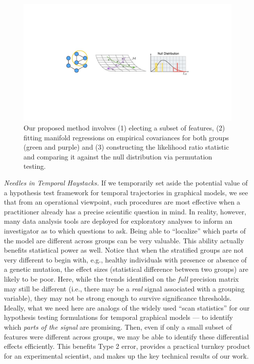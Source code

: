 \begin{figure}[h]
    \centering
    \includegraphics[width=\columnwidth,trim={6.5cm 7.5cm 6.5cm 7.5cm},clip]{chap2/method.jpg}
    \caption{\small\label{fig:model} Our proposed method involves (1) electing a subset of features, (2) fitting manifold regressions on empirical covariances for both groups (green and purple) and (3) constructing the likelihood ratio statistic and comparing it against the null distribution via permutation testing.}
\end{figure}

{\em Needles in Temporal Haystacks.} If we temporarily set aside the potential value of a hypothesis test framework for temporal 
trajectories in graphical models, we see that
from an operational viewpoint, such procedures are most effective when a practitioner already has a precise scientific question in mind. In reality, however, 
many data analysis tools are deployed for exploratory analyses to inform an investigator as to which questions to ask. 
Being able to ``localize'' which parts of the model are different across groups can be very valuable. This ability actually 
benefits statistical power as well. Notice that when the stratified groups are not very different 
to begin with, e.g., healthy individuals with presence or absence of a genetic mutation, the
effect sizes (statistical difference between two groups) are likely to be poor.
Here, while the trends identified on the {\em full} precision matrix may still be different (i.e., there may be a {\em real} signal 
associated with a grouping variable), 
they may not be strong enough to survive significance thresholds. Ideally, what we need here are analogs of the widely used ``scan statistics'' 
for our hypothesis testing formulations for temporal graphical models --- to identify which {\em parts of the signal} are promising. 
Then, even if only a small subset of 
features were different across groups,
we may be able to identify these differential effects efficiently. This benefits Type 2 error, 
provides a practical turnkey product for an experimental scientist, and makes up the key technical results of our work.

